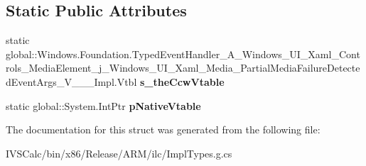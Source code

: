 \subsection*{Static Public Attributes}
\begin{DoxyCompactItemize}
\item 
\mbox{\label{struct_windows_1_1_foundation_1_1_typed_event_handler___a___windows___u_i___xaml___controls___meab68a8b38914bc3ba3e7f1414dd848fa_a9d9ac3af48a54a888000f4bee170d712}} 
static global\+::\+Windows.\+Foundation.\+Typed\+Event\+Handler\+\_\+\+A\+\_\+\+Windows\+\_\+\+U\+I\+\_\+\+Xaml\+\_\+\+Controls\+\_\+\+Media\+Element\+\_\+j\+\_\+\+Windows\+\_\+\+U\+I\+\_\+\+Xaml\+\_\+\+Media\+\_\+\+Partial\+Media\+Failure\+Detected\+Event\+Args\+\_\+\+V\+\_\+\+\_\+\+\_\+\+Impl.\+Vtbl {\bfseries s\+\_\+the\+Ccw\+Vtable}
\item 
\mbox{\label{struct_windows_1_1_foundation_1_1_typed_event_handler___a___windows___u_i___xaml___controls___meab68a8b38914bc3ba3e7f1414dd848fa_a2f8cdf824726b34c9a79150fb111f704}} 
static global\+::\+System.\+Int\+Ptr {\bfseries p\+Native\+Vtable}
\end{DoxyCompactItemize}


The documentation for this struct was generated from the following file\+:\begin{DoxyCompactItemize}
\item 
I\+V\+S\+Calc/bin/x86/\+Release/\+A\+R\+M/ilc/Impl\+Types.\+g.\+cs\end{DoxyCompactItemize}
